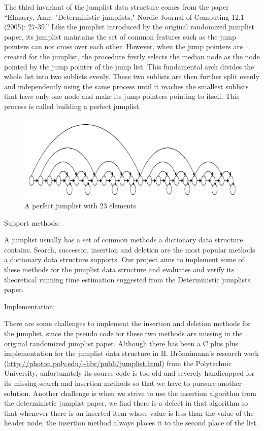 \documentclass[oribibl]{llncs}
\begin{document}
The third invariant of the jumplist data structure comes from the paper “Elmasry, Amr. "Deterministic jumplists." Nordic Journal of Computing 12.1 (2005): 27-39.” Like the jumplist introduced by the original randomized jumplist paper, its jumplist maintains the set of common features such as the jump pointers can not cross over  each other. However, when the jump pointers are created for the jumplist, the procedure firstly selects the median node as the node pointed by the jump pointer of the jump list. This fundamental arch divides the whole list into two sublists evenly. These two sublists are then further split evenly and independently using the same process until it reaches the smallest sublists that have only one node and make its jump pointers pointing to itself. This process is called building a perfect jumplist.


\begin{figure}[here]
\center
\includegraphics[width=12cm]{images/perfect_jumplist}
\caption{A perfect jumplist with 23 elements}
\label{fig:jumplist}
\end{figure}


Support methods:

A jumplist usually has a set of common methods a dictionary data structure contains. Search, successor, insertion and deletion are the most popular methods a dictionary data structure supports. Our project aims to implement some of these methods for the jumplist data structure and evaluates and verify its theoretical running time estimation suggested from the Deterministic jumplists paper.

Implementation:

There are some challenges to implement the insertion and deletion methods for the jumplist, since the pseudo code for these two methods are missing in the original randomized jumplist paper. Although there has been a C plus plus implementation for the jumplist data structure in H. Brönnimann’s research work (\url{http://photon.poly.edu/~hbr/publi/jumplist.html}) from the Polytechnic University, unfortunately its source code is too old and severely handicapped for its missing search and insertion methods so that we have to pursure another solution. Another challenge is when we strive to use the insertion algorithm from the deterministic jumplist paper, we find there is a defect in that algorithm so that whenever there is an inserted item whose value is less than the value of the header node, the insertion method always places it to the second place of the list.
\end{document}
